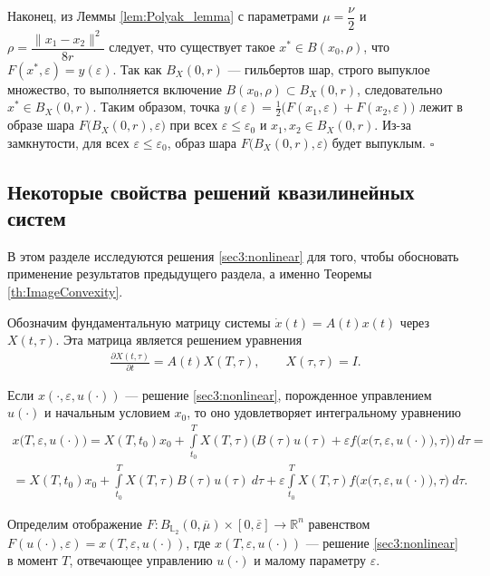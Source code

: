\documentclass[../main.tex]{subfiles}
\begin{document}
Наконец, из Леммы \ref{lem:Polyak_lemma} с параметрами $\mu=\dfrac{\nu}{2}$ и $\rho=\dfrac{\|x_1-x_2\|^2}{8r}$ следует, что существует такое $x^*\in B(x_0, \rho)$, что $F(x^*,\varepsilon) = y(\varepsilon)$.
Так как $B_X(0, r)$ --- гильбертов шар, строго выпуклое множество, то выполняется включение $B(x_0, \rho) \subset B_X(0, r)$, следовательно $x^* \in B_X(0, r)$. 
Таким образом, точка $y(\varepsilon) = \frac{1}{2} \big( F(x_1,\varepsilon) + F(x_2,\varepsilon)\big)$ лежит в образе шара $F\big(B_X(0,r),\varepsilon\big) $ при всех $\varepsilon \leqslant \varepsilon_0$ и $x_1, x_2 \in B_X(0,r)$. 
Из-за замкнутости, для всех $\varepsilon \leqslant \varepsilon_0$, образ шара $F\big(B_X(0,r),\varepsilon\big) $ будет выпуклым.
\hfill$\square$\\[1ex]%

\subsection{Некоторые свойства решений квазилинейных систем}


В этом разделе исследуются решения \eqref{sec3:nonlinear} для того, чтобы обосновать применение результатов предыдущего раздела, а именно Теоремы \ref{th:ImageConvexity}. 

Обозначим фундаментальную матрицу системы $\dot{x}(t) = A(t) x(t)$ через $X(t,\tau)$.
Эта матрица является решением уравнения
\begin{gather*}
 \frac{\partial X(t,\tau)}{\partial t} = A(t) X(T,\tau), \qquad X(\tau,\tau) = I.
\end{gather*}

Если $x(\cdot,\varepsilon, u(\cdot))$ --- решение \eqref{sec3:nonlinear}, порожденное управлением $u(\cdot)$ и начальным условием $x_0$, то оно удовлетворяет интегральному уравнению
\begin{gather*}
 x\big(T,\varepsilon, u(\cdot)\big) =
 X(T,t_0)x_0 + 
 \int\limits_{t_0}^T X(T,\tau) \bigg(B(\tau)u(\tau) +
 \varepsilon f\Big(x\big(\tau,\varepsilon, u(\cdot)\big),\tau\Big) \bigg)\ d\tau = \\ =
 X(T,t_0)x_0 +
 \int\limits_{t_0}^T X(T,\tau) B(\tau)u(\tau)\ d\tau 
 + \varepsilon \int\limits_{t_0}^T X(T,\tau) f\Big(x\big(\tau,\varepsilon, u(\cdot)\big),\tau\Big) \ d\tau.
\end{gather*}

Определим отображение $F:B_{\mathbb{L}_2}(0,\overline{\mu})\times [0,\overline{\varepsilon}] \to \mathbb{R}^n$ равенством $F(u(\cdot),\varepsilon) = x(T,\varepsilon,u(\cdot))$, где $x(T,\varepsilon,u(\cdot))$ --- решение \eqref{sec3:nonlinear} в момент $T$, отвечающее управлению $u(\cdot)$ и малому параметру $\varepsilon$.
\end{document}
